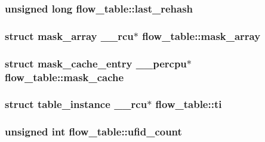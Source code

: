 \subsubsection[{last\+\_\+rehash}]{\setlength{\rightskip}{0pt plus 5cm}unsigned long flow\+\_\+table\+::last\+\_\+rehash}\label{structflow__table_a82c7cfef05b2898b3ffb3b6cb6fdc6a4}
\hypertarget{structflow__table_a0e568d59590f38936b714555597505be}{}
\subsubsection[{mask\+\_\+array}]{\setlength{\rightskip}{0pt plus 5cm}struct {\bf mask\+\_\+array} {\bf \+\_\+\+\_\+rcu}$\ast$ flow\+\_\+table\+::mask\+\_\+array}\label{structflow__table_a0e568d59590f38936b714555597505be}
\hypertarget{structflow__table_a7395c72250199771559f2aaf32da5d0d}{}
\subsubsection[{mask\+\_\+cache}]{\setlength{\rightskip}{0pt plus 5cm}struct {\bf mask\+\_\+cache\+\_\+entry} {\bf \+\_\+\+\_\+percpu}$\ast$ flow\+\_\+table\+::mask\+\_\+cache}\label{structflow__table_a7395c72250199771559f2aaf32da5d0d}
\hypertarget{structflow__table_a49d708e68608d510f6d25a16a14fd565}{}
\subsubsection[{ti}]{\setlength{\rightskip}{0pt plus 5cm}struct {\bf table\+\_\+instance} {\bf \+\_\+\+\_\+rcu}$\ast$ flow\+\_\+table\+::ti}\label{structflow__table_a49d708e68608d510f6d25a16a14fd565}
\hypertarget{structflow__table_ad8ff1e259e64690608d9552f0b467bf0}{}
\subsubsection[{ufid\+\_\+count}]{\setlength{\rightskip}{0pt plus 5cm}unsigned int flow\+\_\+table\+::ufid\+\_\+count}\label{structflow__table_ad8ff1e259e64690608d9552f0b467bf0}
\hypertarget{structflow__table_aa29e185501af8dcd15549ee157c6c047}{}
